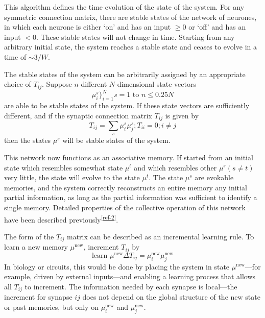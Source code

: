 \documentclass[11pt,letterpaper]{article}
\begin{document}
	This algorithm defines the time evolution of the state of the system. For any symmetric connection matrix, there are stable states of the network of neurones, in which each neurone is either `on' and has an input $\geq0$ or `off' and has an input $<0$. These stable states will not change in time. Starting from any arbitrary initial state, the system reaches a stable state and ceases to evolve in a time of $\sim3/W$.
	
	The stable states of the system can be arbitrarily assigned by an appropriate choice of $T_{ij}$. Suppose $n$ different $N$-dimensional state vectors
	\begin{equation}
		\mu_{i}^{s}\}_{i=1}^{N} s=1 \text{ to } n\leq0.25N
	\end{equation}
	are able to be stable states of the system. If these state vectors are sufficiently different, and if the synaptic connection matrix $T_{ij}$ is given by
	\begin{equation}
		T_{ij}=\sum_{s} \mu_{i}^{s} \mu_{j}^{s};T_{ii}=0; i\neq j
	\end{equation}
	then the states $\mu^{s}$ will be stable states of the system.
	
	This network now functions as an associative memory. If started from an initial state which resembles somewhat state $\mu^{t}$ and which resembles other $\mu^{s}(s\neq t)$ very little, the state will evolve to the state $\mu^{t}$. The state $\mu^{s}$ are evokable memories, and the system correctly reconstructs an entire memory any initial partial information, as long as the partial information was sufficient to identify a single memory. Detailed properties of the collective operation of this network have been described previously\textsuperscript{\ref{ref-2}}.
	
	The form of the $T_{ij}$ matrix can be described as an incremental learning rule. To learn a new memory $\mu^{\text{new}}$, increment $T_{ij}$ by
	\begin{equation}
		\text{learn } \mu^{\text{new}} \Delta T_{ij}= \mu_{i}^{\text{new}} \mu_{j}^{\text{new}}
	\end{equation}
	In biology or circuits, this would be done by placing the system in state $\mu^{\text{new}}$---for example, driven by external inputs---and enabling a learning process that allows all $T_{ij}$ to increment. The information needed by each synapse is local---the increment for synapse $ij$ does not depend on the global structure of the new state or past memories, but only on $\mu_{i}^{\text{new}}$ and $\mu_{j}^{\text{new}}$.
		
\end{document}
